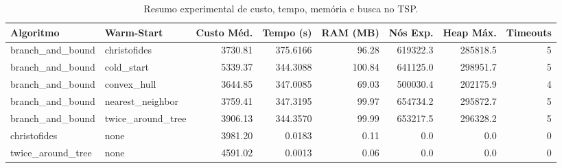 \begin{table}[htbp]
\centering
\caption{Resumo experimental de custo, tempo, memória e busca no TSP.}
\label{tab:resumo_tsp}
\begin{tabular}{llrrrrrr}
\hline
Algoritmo & Warm-Start & Custo Méd. & Tempo (s) & RAM (MB) & Nós Exp. & Heap Máx. & Timeouts \\
\hline
branch\_and\_bound & christofides & 3730.81 & 375.6166 & 96.28 & 619322.3 & 285818.5 & 5 \\
branch\_and\_bound & cold\_start & 5339.37 & 344.3088 & 100.84 & 641125.0 & 298951.7 & 5 \\
branch\_and\_bound & convex\_hull & 3644.85 & 347.0085 & 69.03 & 500030.4 & 202175.9 & 4 \\
branch\_and\_bound & nearest\_neighbor & 3759.41 & 347.3195 & 99.97 & 654734.2 & 295872.7 & 5 \\
branch\_and\_bound & twice\_around\_tree & 3906.13 & 344.3570 & 99.99 & 653217.5 & 296328.2 & 5 \\
christofides & none & 3981.20 & 0.0183 & 0.11 & 0.0 & 0.0 & 0 \\
twice\_around\_tree & none & 4591.02 & 0.0013 & 0.06 & 0.0 & 0.0 & 0 \\
\hline
\end{tabular}
\end{table}
